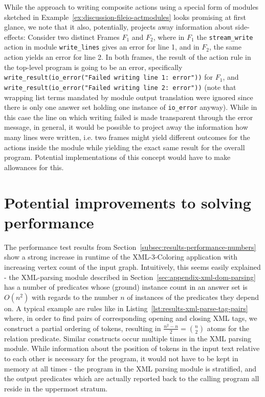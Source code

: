 While the approach to writing composite actions using a special form of modules sketched in Example~\ref{ex:discussion-fileio-actmodules} looks promising at first glance, we note that it also, potentially, projects away information about side-effects: Consider two distinct Frames $F_1$ and $F_2$, where in $F_1$ the \texttt{stream\_write} action in module \texttt{write\_lines} gives an error for line 1, and in $F_2$, the same action yields an error for line 2. In both frames, the result of the action rule in the top-level program is going to be an error, specifically \texttt{write\_result(io\_error("Failed writing line 1: error"))} for $F_1$, and \texttt{write\_result(io\_error("Failed writing line 2: error"))} (note that wrapping list terms mandated by module output translation were ignored since there is only one answer set holding one instance of \texttt{io\_error} anyway). While in this case the line on which writing failed is made transparent through the error message, in general, it would be possible to project away the information how many lines were written, i.e. two frames might yield different outcomes for the actions inside the module while yielding the exact same result for the overall program. Potential implementations of this concept would have to make allowances for this.


\section{Potential improvements to solving performance}

The performance test results from Section~\ref{subsec:results-performance-numbers} show a strong increase in runtime of the XML-3-Coloring application with increasing vertex count of the input graph. Intuitively, this seems easily explained - the XML-parsing module described in Section~\ref{sec:appendix-xml-dom-parsing} has a number of predicates whose (ground) instance count in an answer set is $O(n^2)$ with regards to the number $n$ of instances of the predicates they depend on. A typical example are rules like in Listing~\ref{lst:results-xml-parse-tag-pairs} where, in order to find pairs of corresponding opening and closing XML tags, we construct a partial ordering of tokens, resulting in $\frac{n^2 - n}{2} = \binom{n}{2}$ atoms for the relation predicate. Similar constructs occur multiple times in the XML parsing module. While information about the position of tokens in the input text relative to each other is necessary for the program, it would not have to be kept in memory at all times - the program in the XML parsing module is stratified, and the output predicates which are actually reported back to the calling program all reside in the uppermost stratum.

